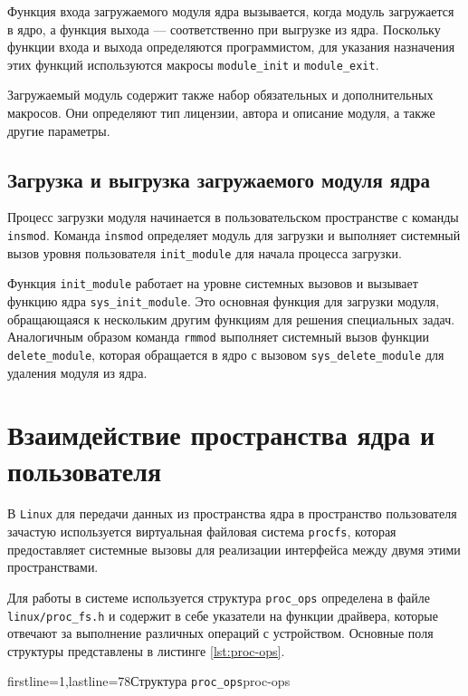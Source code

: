 Функция входа загружаемого модуля ядра вызывается, когда модуль загружается в ядро, а функция выхода –-- соответственно при выгрузке из ядра. Поскольку функции входа и выхода определяются программистом, для указания назначения этих функций используются макросы \texttt{module\_init} и \texttt{module\_exit}. 

Загружаемый модуль содержит также набор обязательных и дополнительных макросов. Они определяют тип лицензии, автора и описание модуля, а также другие параметры.


\subsection{Загрузка и выгрузка загружаемого модуля ядра}

Процесс загрузки модуля начинается в пользовательском пространстве с команды \texttt{insmod}. Команда \texttt{insmod} определяет модуль для загрузки и выполняет системный вызов уровня пользователя \texttt{init\_module} для начала процесса загрузки.

Функция \texttt{init\_module} работает на уровне системных вызовов и вызывает функцию  ядра  \texttt{sys\_init\_module}.  Это  основная  функция  для загрузки модуля, обращающаяся к нескольким другим функциям для решения специальных  задач.  Аналогичным  образом  команда  \texttt{rmmod}  выполняет системный  вызов  функции  \texttt{delete\_module},  которая  обращается  в  ядро  с вызовом \texttt{sys\_delete\_module} для удаления модуля из ядра.


\section{Взаимдействие пространства ядра и пользователя}

В \texttt{Linux} для передачи данных из пространства ядра в пространство пользователя зачастую используется виртуальная файловая система \texttt{procfs}, которая предоставляет системные вызовы для реализации интерфейса между двумя этими пространствами. 

Для работы в системе используется структура \texttt{proc\_ops} определена в файле \texttt{linux/proc\_fs.h} и содержит в себе указатели на функции драйвера, которые отвечают за выполнение различных операций с устройством. Основные поля структуры представлены в листинге \ref{lst:proc-ops}.

        {firstline=1,lastline=78}{Структура \texttt{proc\_ops}}{proc-ops}{}

